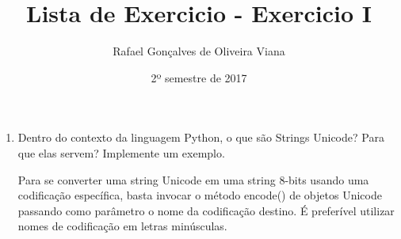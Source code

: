 \documentclass[12pt]{article}
\title{Lista de Exercicio  - Exercicio I }
\author{Rafael Gonçalves de  Oliveira Viana}
\date{2º semestre de 2017}
\begin{document}
\maketitle

\begin{enumerate}
\item
Dentro do contexto da linguagem Python, o que são Strings Unicode? Para que elas
servem? Implemente um exemplo.

Para se converter uma string Unicode em uma string 8-bits usando uma codificação específica, basta invocar o método encode() de objetos Unicode passando como parâmetro o nome da codificação destino. É preferível utilizar nomes de codificação em letras minúsculas.


\end{enumerate}
\end{document}
